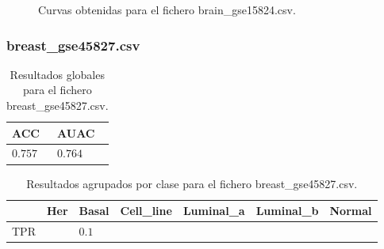 \clearpage

\begin{figure}[htp]
    \centering
    \caption{Curvas obtenidas para el fichero brain\_gse15824.csv.}
    \label{fig:3}
\end{figure}

\bigbreak

\lipsum[1]

\clearpage

\subsubsection{breast\_gse45827.csv}

\begin{table}[htp]
    \small
    \centering
    \begin{tabularx}{\columnwidth}{Y Y}
        ACC       & AUAC    \\\hline
        $0.757$   & $0.764$ \\\hline
    \end{tabularx}
    \caption{Resultados globales para el fichero breast\_gse45827.csv.}
    \label{tab:7}
\end{table}

\begin{table}[htp]
    \small
    \centering
    \begin{tabularx}{\columnwidth}{X X X X X X X}
                &  Her  & Basal & Cell\_line & Luminal\_a & Luminal\_b & Normal    \\\hline
        TPR     &       & $0.1$ &           &           &           &           \\\hline
    \end{tabularx}
    \caption{Resultados agrupados por clase para el fichero breast\_gse45827.csv.}
    \label{tab:8}
\end{table}

\clearpage